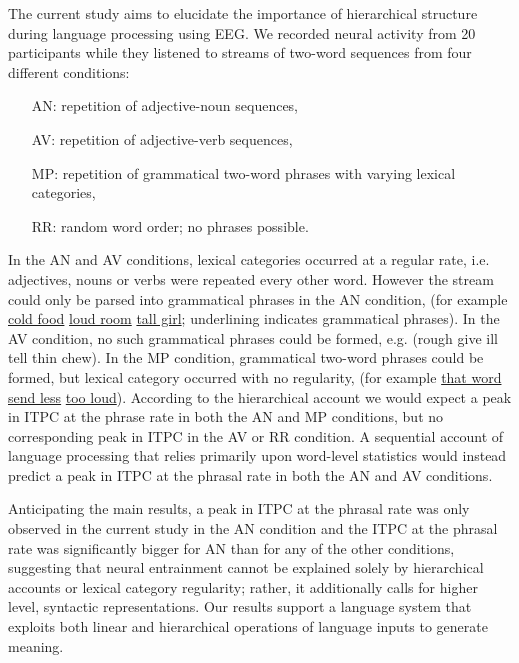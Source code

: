\documentclass[10pt,letterpaper]{article}
\begin{document}
The current study aims to elucidate the importance of hierarchical structure during language processing using EEG. We recorded neural activity from 20 participants while they listened to streams of two-word sequences from four different conditions:
\begin{enumerate}
    \item[AN:] repetition of adjective-noun sequences, 
    \item[AV:] repetition of adjective-verb sequences, 
    \item[MP:] repetition of grammatical two-word phrases with varying lexical categories, 
    \item [RR:] random word order; no phrases possible.
    \end{enumerate}
    In the AN and AV conditions, lexical categories occurred at a regular rate, i.e. adjectives, nouns or verbs were repeated every other word. However the stream could only be parsed into grammatical phrases in the AN condition, (for example \underline{cold food} \underline{loud room} \underline{tall girl}; underlining indicates grammatical phrases). In the AV condition, no such grammatical phrases could be formed, e.g. (rough give ill tell thin chew). In the MP condition, grammatical two-word phrases could be formed, but lexical category occurred with no regularity, (for example \underline{that word} \underline{send less} \underline{too loud}). According to the hierarchical account we would expect a peak in ITPC at the phrase rate in both the AN and MP conditions, but no corresponding peak in ITPC in the AV or RR condition. A sequential account of language processing that relies primarily upon word-level statistics would instead predict a peak in ITPC at the phrasal rate in both the AN and AV conditions. 

Anticipating the main results, a peak in ITPC at the phrasal rate was only observed in the current study in the AN condition and the ITPC at the phrasal rate was significantly bigger for AN than for any of the other conditions, suggesting that neural entrainment cannot be explained solely by hierarchical accounts or lexical category regularity; rather, it additionally calls for higher level, syntactic representations. Our results support a language system that exploits both linear and hierarchical operations of language inputs to generate meaning. 
\end{document}
